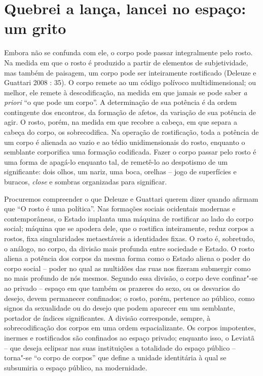 \section{Quebrei a lança, lancei no espaço: um grito}

Embora não se confunda com ele, o corpo pode passar integralmente pelo
rosto. Na medida em que o rosto é produzido a partir de elementos de
subjetividade, mas também de paisagem, um corpo pode ser inteiramente
rostificado (Deleuze e Guattari 2008 : 35). O corpo remete ao um código
polívoco multidimensional; ou melhor, ele remete à descodificação, na
medida em que jamais se pode saber \emph{a priori} ``o que pode um
corpo''. A determinação de sua potência é da ordem contingente dos
encontros, da formação de afetos, da variação de sua potência de agir. O
rosto, porém, na medida em que recobre a cabeça, em que separa a cabeça
do corpo, os sobrecodifica. Na operação de rostificação, toda a potência
de um corpo é alienada ao vazio e ao tédio unidimensionais do rosto,
enquanto o semblante corporifica uma formação codificada. Fazer o corpo
passar pelo rosto é uma forma de apagá-lo enquanto tal, de remetê-lo ao
despotismo de um significante: dois olhos, um nariz, uma boca, orelhas
-- jogo de superfícies e buracos, \emph{close} e sombras organizadas
para significar.

Procuremos compreender o que Deleuze e Guattari querem dizer quando
afirmam que ``O rosto é uma política''. Nas formações sociais ocidentais
modernas e contemporâneas, o Estado implanta uma máquina de rostificar
ao lado do corpo social; máquina que se apodera dele, que o rostifica
inteiramente, reduz corpos a rostos, fixa singularidades metaestáveis a
identidades fixas. O rosto é, sobretudo, o análogo, no corpo, da divisão
mais profunda entre sociedade e Estado. O rosto aliena a potência dos
corpos da mesma forma como o Estado aliena o poder do corpo social --
poder no qual as multidões das ruas nos fizeram submergir como no mais
profundo de nós mesmos. Segundo essa divisão, o corpo deve confinar"-se
ao privado -- espaço em que também os prazeres do sexo, ou os desvarios
do desejo, devem permanecer confinados; o rosto, porém, pertence ao
público, como signos da sexualidade ou do desejo que podem aparecer em
um semblante, portador de índices significantes. A divisão corresponde,
sempre, à sobrecodificação dos corpos em uma ordem espacializante. Os
corpos impotentes, inermes e rostificados são confinados ao espaço
privado; enquanto isso, o Leviatã -- que deseja eclipsar nas suas
instituições a totalidade do espaço público -- torna"-se ``o corpo de
corpos'' que define a unidade identitária à qual se subsumiria o espaço
público, na modernidade.

